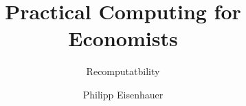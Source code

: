 \title{Practical Computing for Economists}
\subtitle{Recomputatbility}
\author{Philipp Eisenhauer}
\date{}